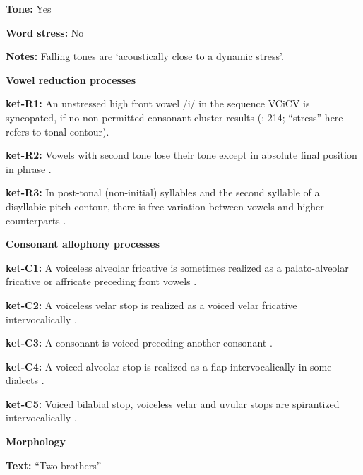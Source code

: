 \textbf{Tone:} Yes



\textbf{Word stress:} No



\textbf{Notes:} Falling tones are ‘acoustically close to a dynamic stress’.



\textbf{Vowel reduction processes}



\textbf{ket-R1:} An unstressed high front vowel /i/ in the sequence VCiCV is syncopated, if no non-permitted consonant cluster results (\citealt{Georg2007}: 214; “stress” here refers to tonal contour).



\textbf{ket-R2:} Vowels with second tone lose their tone except in absolute final position in phrase \citep[15-16]{Vajda2000}.



\textbf{ket-R3:} In post-tonal (non-initial) syllables and the second syllable of a disyllabic pitch contour, there is free variation between vowels and higher counterparts \citep[11]{Vajda2000}.



\textbf{Consonant allophony processes}



\textbf{ket-C1:} A voiceless alveolar fricative is sometimes realized as a palato-alveolar fricative or affricate preceding front vowels \citep[78]{Georg2007}.



\textbf{ket-C2:} A voiceless velar stop is realized as a voiced velar fricative intervocalically \citep[75]{Georg2007}.



\textbf{ket-C3:} A consonant is voiced preceding another consonant \citep[75]{Georg2007}.



\textbf{ket-C4:} A voiced alveolar stop is realized as a flap intervocalically in some dialects \citep[76]{Georg2007}.



\textbf{ket-C5:} Voiced bilabial stop, voiceless velar and uvular stops are spirantized intervocalically \citep[75-8]{Georg2007}.



\textbf{Morphology}



\textbf{Text:} “Two brothers” \citep[92-97]{Vajda2004}



